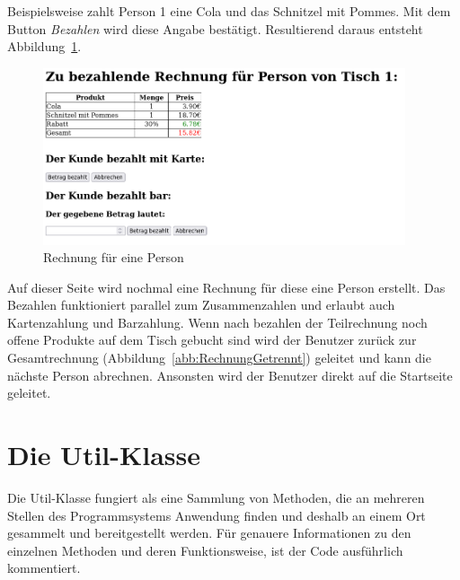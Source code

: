 Beispielsweise zahlt Person 1 eine Cola und das Schnitzel mit Pommes.
Mit dem Button \textit{Bezahlen} wird diese Angabe bestätigt.
Resultierend daraus entsteht Abbildung~\ref{abb:RechnungGetrenntZahlen}.

\begin{figure}[htb]
  \centering
  \includegraphics[width=0.95\textwidth]{images/RechnungGetrenntZahlen.png}
  \caption[Rechnung für eine Person]{Rechnung für eine Person}
  \label{abb:RechnungGetrenntZahlen}
\end{figure}

Auf dieser Seite wird nochmal eine Rechnung für diese eine Person erstellt.
Das Bezahlen funktioniert parallel zum Zusammenzahlen und erlaubt auch Kartenzahlung und Barzahlung.
Wenn nach bezahlen der Teilrechnung noch offene Produkte auf dem Tisch gebucht sind wird der Benutzer zurück zur Gesamtrechnung (Abbildung~\ref{abb:RechnungGetrennt}) geleitet und kann die nächste Person abrechnen.
Ansonsten wird der Benutzer direkt auf die Startseite geleitet.



\section{Die Util-Klasse} %
\label{sec:Die Util-Klasse}

Die Util-Klasse fungiert als eine Sammlung von Methoden, die an mehreren Stellen des Programmsystems Anwendung finden und deshalb an einem Ort gesammelt und bereitgestellt werden.
Für genauere Informationen zu den einzelnen Methoden und deren Funktionsweise, ist der Code ausführlich kommentiert.



